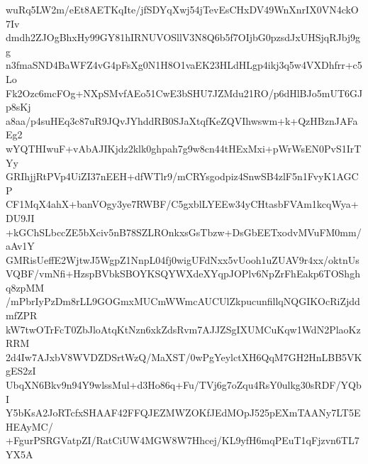 wuRq5LW2m/eEt8AETKqIte/jfSDYqXwj54jTevEsCHxDV49WnXnrIX0VN4ckO7Iv
dmdh2ZJOgBhxHy99GY81hIRNUVOSllV3N8Q6b5f7OIjbG0pzsdJxUHSjqRJbj9gg
n3fmaSND4BaWFZ4vG4pFsXg0N1H8O1vaEK23HLdHLgp4ikj3q5w4VXDhfrr+c5Lo
Fk2Ozc6mcFOg+NXpSMvfAEo51CwE3bSHU7JZMdu21RO/p6dHlBJo5mUT6GJp8sKj
a8aa/p4suHEq3c87uR9JQvJYhddRB0SJaXtqfKeZQVIhwswm+k+QzHBznJAFaEg2
wYQTHIwuF+vAbAJIKjdz2klk0ghpah7g9w8cn44tHExMxi+pWrWsEN0PvS1IrTYy
GRIhjjRtPVp4UiZI37nEEH+dfWTlr9/mCRYsgodpiz4SnwSB4zlF5n1FvyK1AGCP
CF1MqX4ahX+banVOgy3ye7RWBF/C5gxblLYEEw34yCHtasbFVAm1kcqWya+DU9JI
+kGChSLbccZE5bXciv5nB78SZLROnkxsGsTbzw+DsGbEETxodvMVuFM0mm/aAv1Y
GMRisUeffE2WjtwJ5WgpZ1NnpL04fj0wigUFdNxx5vUooh1uZUAV9r4xx/oktnUs
VQBF/vmNfi+HzspBVbkSBOYKSQYWXdeXYqpJOPlv6NpZrFhEakp6TOShghq8zpMM
/mPbrIyPzDm8rLL9GOGmxMUCmWWmcAUCUlZkpucunfillqNQGIKOcRiZjddmfZPR
kW7twOTrFcT0ZbJloAtqKtNzn6xkZdsRvm7AJJZSgIXUMCuKqw1WdN2PlaoKzRRM
2d4Iw7AJxbV8WVDZDSrtWzQ/MaXST/0wPgYeylctXH6QqM7GH2HnLBB5VKgES2zI
UbqXN6Bkv9n94Y9wlssMul+d3Ho86q+Fu/TVj6g7oZqu4RsY0ulkg30sRDF/YQbI
Y5bKsA2JoRTcfxSHAAF42FFQJEZMWZOKfJEdMOpJ525pEXmTAANy7LT5EHEAyMC/
+FgurPSRGVatpZI/RatCiUW4MGW8W7Hhcej/KL9yfH6mqPEuT1qFjzvn6TL7YX5A
